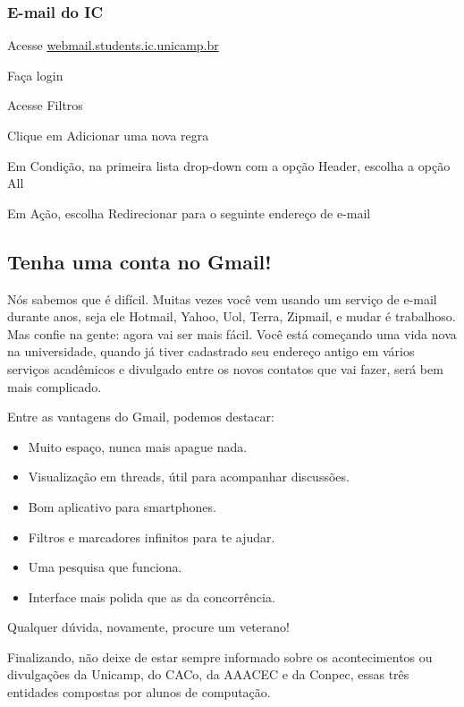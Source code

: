 \subsubsection*{E-mail do IC}

\begin{compactenumerate}
    \item  Acesse \url{webmail.students.ic.unicamp.br}
    \item  Faça login
    \item  Acesse Filtros
    \item  Clique em Adicionar uma nova regra
    \item  Em Condição, na primeira lista drop-down com a opção Header, escolha a opção All
    \item  Em Ação, escolha Redirecionar para o seguinte endereço de e-mail
\end{compactenumerate}

\subsection{Tenha uma conta no Gmail!}

Nós sabemos que é difícil. Muitas vezes você vem usando um serviço de e-mail
durante anos, seja ele Hotmail, Yahoo, Uol, Terra, Zipmail, e mudar é
trabalhoso.  Mas confie na gente: agora vai ser mais fácil. Você está começando
uma vida nova na universidade, quando já tiver cadastrado seu endereço antigo em
vários serviços acadêmicos e divulgado entre os novos contatos que vai fazer,
será bem mais complicado.

Entre as vantagens do Gmail, podemos destacar:

\begin{itemize}
    \item Muito espaço, nunca mais apague nada.
    \item Visualização em threads, útil para acompanhar discussões.
    \item Bom aplicativo para smartphones.
    \item Filtros e marcadores infinitos para te ajudar.
    \item Uma pesquisa que funciona.
    \item Interface mais polida que as da concorrência.
\end{itemize}

Qualquer dúvida, novamente, procure um veterano!

Finalizando, não deixe de estar sempre informado sobre os acontecimentos ou
divulgações da Unicamp, do CACo, da AAACEC e da Conpec, essas três entidades
compostas por alunos de computação.
